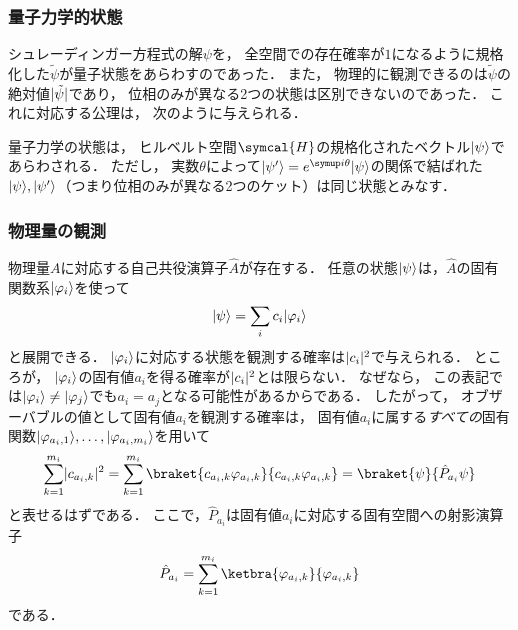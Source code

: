 \documentclass[
]{sotsu}
\begin{document}
\subsubsection{量子力学的状態}

シュレーディンガー方程式の解$\psi$を，
全空間での存在確率が$1$になるように規格化した$\tilde{\psi}$が量子状態をあらわすのであった．
また，
物理的に観測できるのは$\tilde{\psi}$の絶対値$\lvert\tilde{\psi}\rvert$であり，
位相のみが異なる2つの状態は区別できないのであった．
これに対応する公理は，
次のように与えられる．

\begin{qmaxiom}[状態は規格化されたベクトルとしてあらわされる]
    量子力学の状態は，
    ヒルベルト空間$\symcal{H}$の規格化されたベクトル$\lvert\psi\rangle$であらわされる．
    ただし，
    実数$\theta$によって$\ket{\psi'} = e^{\iu \theta} \ket{\psi}$の関係で結ばれた$\lvert\psi\rangle, \lvert\psi'\rangle$（つまり位相のみが異なる2つのケット）は同じ状態とみなす．    
\end{qmaxiom}


\subsubsection{物理量の観測}

物理量$A$に対応する自己共役演算子$\hat{A}$が存在する．
任意の状態$\lvert\psi\rangle$は，$\hat{A}$の固有関数系$\lvert\varphi_i\rangle$を使って
\begin{equation*}
    \lvert\psi\rangle = \sum_i c_i \lvert\varphi_i\rangle
\end{equation*}
と展開できる．
$\lvert\varphi_i\rangle$に対応する状態を観測する確率は$\lvert c_i\rvert^2$で与えられる．
ところが，
$\lvert\varphi_i\rangle$の固有値$a_i$を得る確率が$\lvert c_i\rvert^2$とは限らない．
なぜなら，
この表記では$\lvert\varphi_i\rangle \neq \lvert\varphi_j\rangle$でも$a_i = a_j$となる可能性があるからである．
したがって，
オブザーバブルの値として固有値$a_i$を観測する確率は，
固有値$a_i$に属する\emph{すべての}固有関数$\lvert\varphi_{a_i, 1}\rangle, \dots, \lvert\varphi_{a_i, m_i}\rangle$を用いて
\begin{equation*}
    \sum_{k = 1}^{m_i} \abs{c_{a_i, k}}^2
    = \sum_{k = 1}^{m_i} \braket{c_{a_i, k} \varphi_{a_i, k}}{c_{a_i, k} \varphi_{a_i, k}}
    = \braket{\psi}{\hat{P}_{a_i} \psi}
\end{equation*}
と表せるはずである．
ここで，$\hat{P}_{a_i}$は固有値$a_i$に対応する固有空間への射影演算子
\begin{equation*}
    \hat{P}_{a_i} = \sum_{k = 1}^{m_i} \ketbra{\varphi_{a_i, k}}{\varphi_{a_i, k}}
\end{equation*}
である．
\end{document}
